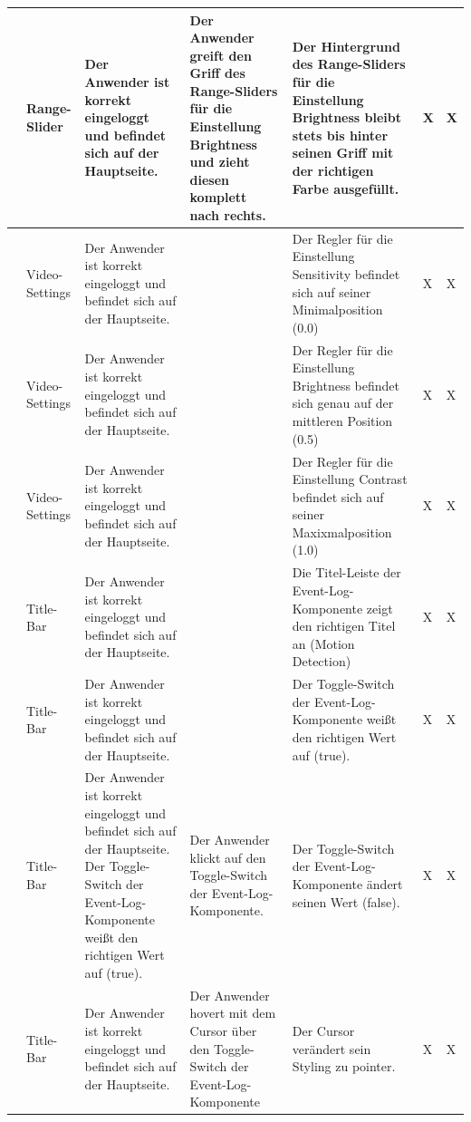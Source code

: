 \begin{longtable}{| p{} | p{} | p{} | p{} | p{} | p{} | p{} |}
	\stepcounter{TestNumber}\arabic{TestNumber} & Range-Slider & Der Anwender ist korrekt eingeloggt und befindet sich auf der Hauptseite. & Der Anwender greift den Griff des Range-Sliders für die Einstellung Brightness und zieht diesen komplett nach rechts. & Der Hintergrund des Range-Sliders für die Einstellung Brightness bleibt stets bis hinter seinen Griff mit der richtigen Farbe ausgefüllt. & X & X \\ \hline
	
	\stepcounter{TestNumber}\arabic{TestNumber} & Video-Settings & Der Anwender ist korrekt eingeloggt und befindet sich auf der Hauptseite. & & Der Regler für die Einstellung Sensitivity befindet sich auf seiner Minimalposition (0.0) & X & X \\ \hline
	
	\stepcounter{TestNumber}\arabic{TestNumber} & Video-Settings & Der Anwender ist korrekt eingeloggt und befindet sich auf der Hauptseite. & & Der Regler für die Einstellung Brightness befindet sich genau auf der mittleren Position (0.5) & X & X \\ \hline
	
	\stepcounter{TestNumber}\arabic{TestNumber} & Video-Settings & Der Anwender ist korrekt eingeloggt und befindet sich auf der Hauptseite. & & Der Regler für die Einstellung Contrast befindet sich auf seiner Maxixmalposition (1.0) & X & X \\ \hline
	
	\stepcounter{TestNumber}\arabic{TestNumber} & Title-Bar & Der Anwender ist korrekt eingeloggt und befindet sich auf der Hauptseite. & & Die Titel-Leiste der Event-Log-Komponente zeigt den richtigen Titel an (Motion Detection) & X & X \\ \hline
	
	\stepcounter{TestNumber}\arabic{TestNumber} & Title-Bar & Der Anwender ist korrekt eingeloggt und befindet sich auf der Hauptseite. & & Der Toggle-Switch der Event-Log-Komponente weißt den richtigen Wert auf (true). & X & X \\ \hline
	
	\stepcounter{TestNumber}\arabic{TestNumber} & Title-Bar & Der Anwender ist korrekt eingeloggt und befindet sich auf der Hauptseite. Der Toggle-Switch der Event-Log-Komponente weißt den richtigen Wert auf (true). & Der Anwender klickt auf den Toggle-Switch der Event-Log-Komponente. & Der Toggle-Switch der Event-Log-Komponente ändert seinen Wert (false). & X & X \\ \hline
	
	\stepcounter{TestNumber}\arabic{TestNumber} & Title-Bar & Der Anwender ist korrekt eingeloggt und befindet sich auf der Hauptseite. & Der Anwender hovert mit dem Cursor über den Toggle-Switch der Event-Log-Komponente & Der Cursor verändert sein Styling zu pointer. & X & X \\ \hline
	

\end{longtable}

